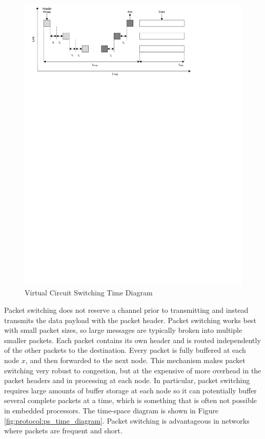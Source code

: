 \begin{figure}[ptb]
	\begin{centering}
		\includegraphics[scale=0.8]{Protocol/Figures/protocol-vcs_time_diagram.pdf}
		\caption[Virtual Circuit Switching Time Diagram]{Virtual Circuit Switching Time Diagram \cite{ref:1997-duato-interconnection_networks}}
		\label{fig:protocol:vcs_time_diagram}
	\end{centering}
\end{figure}

Packet switching does not reserve a channel prior to transmitting and instead transmits the data payload with the packet header. Packet switching works best with small packet sizes, so large messages are typically broken into multiple smaller packets. Each packet contains its own header and is routed independently of the other packets to the destination. Every packet is fully buffered at each node $x$, and then forwarded to the next node. This mechanism makes packet switching very robust to congestion, but at the expensive of more overhead in the packet headers and in processing at each node. In particular, packet switching requires large amounts of buffer storage at each node so it can potentially buffer several complete packets at a time, which is something that is often not possible in embedded processors. The time-space diagram is shown in Figure \ref{fig:protocol:ps_time_diagram}. Packet switching is advantageous in networks where packets are frequent and short. \cite{ref:1997-duato-interconnection_networks}

